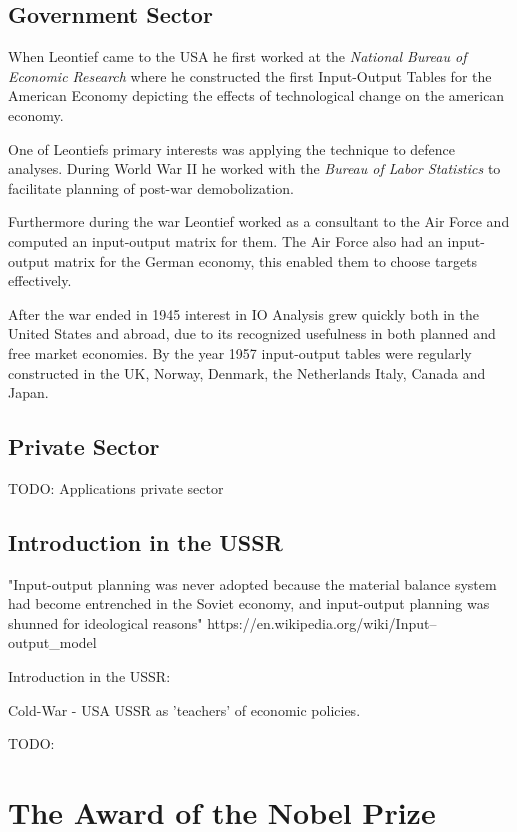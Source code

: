 \documentclass[12pt,a4paper]{scrartcl}
\begin{document}
	\subsection{Government Sector}
	
	When Leontief came to the USA he first worked at the\textit{ National Bureau of Economic Research} where he constructed the first Input-Output Tables for the American Economy depicting the effects of technological change on the american economy.
	
	One of Leontiefs primary interests was applying the technique to defence analyses. During World War II he worked with the \textit{Bureau of Labor Statistics} to facilitate planning of post-war demobolization.
	
	Furthermore during the war Leontief worked as a consultant to the Air Force and computed an input-output matrix for them. The Air Force also had an input-output matrix for the German economy, this enabled them to choose targets effectively.
	
	After the war ended in 1945 interest in IO Analysis grew quickly both in the United States and abroad, due to its recognized usefulness in both planned and free market economies. By the year 1957 input-output tables were regularly constructed in the UK, Norway, Denmark, the Netherlands Italy, Canada and Japan.
	
	\subsection{Private Sector}
	
	TODO: Applications private sector 
	
	\subsection{Introduction in the USSR} \label{ussr}
	"Input-output planning was never adopted because the material balance system had become entrenched in the Soviet economy, and input-output planning was shunned for ideological reasons" 
	 https://en.wikipedia.org/wiki/Input–output\_model
	
	Introduction in the USSR: \cite{leontief1960niedergang}
	
	Cold-War - USA USSR as 'teachers' of economic policies.\newline
	
	TODO:
	
	\section{The Award of the Nobel Prize} \label{nobelprize}
	
\end{document}
